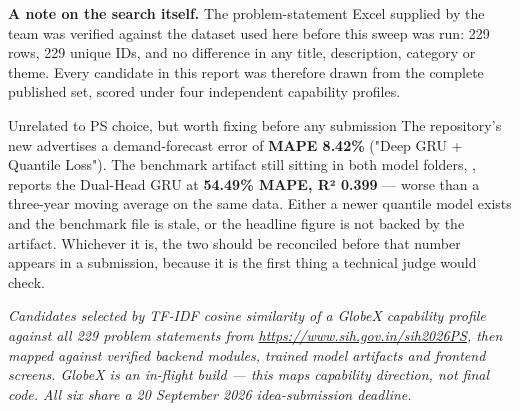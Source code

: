 \documentclass[11pt]{article}
\begin{document}
\vspace{0.9em}
\noindent\textbf{A note on the search itself.} The problem-statement Excel supplied by the team was
verified against the dataset used here before this sweep was run: 229 rows, 229 unique IDs, and no
difference in any title, description, category or theme. Every candidate in this report was therefore
drawn from the complete published set, scored under four independent capability profiles.

\vspace{1.2em}
\begin{warnbox}{Unrelated to PS choice, but worth fixing before any submission}
The repository's new  advertises a demand-forecast error of \textbf{MAPE 8.42\%}
("Deep GRU + Quantile Loss"). The benchmark artifact still sitting in both model folders,
, reports the Dual-Head GRU at \textbf{54.49\% MAPE, R² 0.399} --- worse
than a three-year moving average on the same data. Either a newer quantile model exists and the benchmark
file is stale, or the headline figure is not backed by the artifact. Whichever it is, the two should be
reconciled before that number appears in a submission, because it is the first thing a technical judge
would check.
\end{warnbox}

\vspace{1.5em}
{\footnotesize\color{gxslate}\textit{Candidates selected by TF-IDF cosine similarity of a GlobeX
capability profile against all 229 problem statements from \url{https://www.sih.gov.in/sih2026PS}, then
mapped against verified backend modules, trained model artifacts and frontend screens. GlobeX is an
in-flight build --- this maps capability direction, not final code. All six share a 20 September 2026
idea-submission deadline.}}
\end{document}

